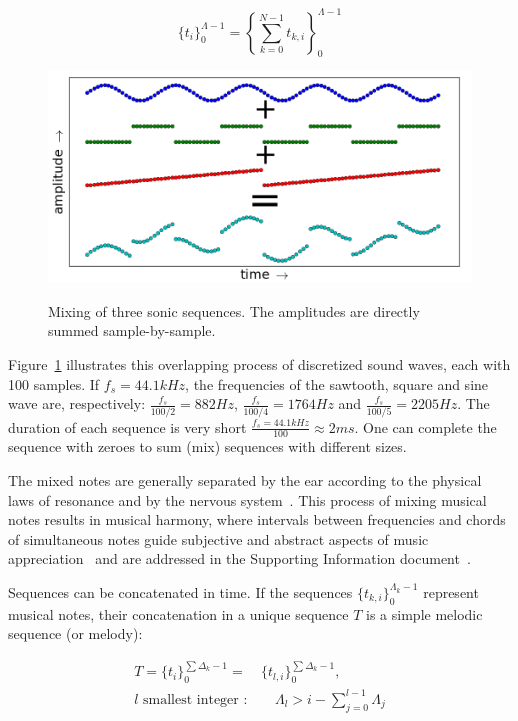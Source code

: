 \begin{equation}\label{eq:mixagem}
\{t_i\}_0^{\Lambda-1}=\left \{ \sum_{k=0}^{N-1}t_{k,i} \right \}_0^{\Lambda-1}
\end{equation}

\begin{figure}[h!]
    {\centering
        \includegraphics[width=.5\columnwidth]{figures/mixagem__}}
    \caption{Mixing of three sonic sequences. The amplitudes are directly summed sample-by-sample.}
        \label{fig:mixagem}
\end{figure}

Figure~\ref{fig:mixagem} illustrates this overlapping process of discretized sound waves, each with 100 samples. If $f_s=44.1kHz$, the frequencies of the sawtooth, square and sine wave are, respectively: $\frac{f_s}{100/2}=882Hz$, $\frac{f_s}{100/4}=1764Hz$ and $\frac{f_s}{100/5}=2205Hz$. The duration of each sequence is very short $\frac{f_s=44.1kHz}{100} \approx 2ms$. One can complete the sequence with zeroes to sum (mix) sequences with different sizes.

The mixed notes are generally separated by the ear according to the physical laws of resonance and by the nervous system~\cite{Roederer}.
This process of mixing musical notes results in musical harmony, where intervals between frequencies and chords of simultaneous notes guide subjective and abstract aspects of music appreciation~\cite{Harmonia} and are addressed in the Supporting Information document~\cite{massNotesInMusic}. 

Sequences can be concatenated in time. If the sequences $\{t_{k,i}\}_0^{\Lambda_k-1}$ represent musical notes,
their concatenation in a unique sequence $T$ is a simple melodic sequence (or melody):

\begin{equation}\label{eq:concatenacao}
\begin{split}
T = \{t_i\}_0^{\sum\Delta_k-1}= & \{t_{l,i}\}_0^{\sum\Delta_k-1}, \;\; \\ l\text{ smallest integer } : & \quad \Lambda_l > i -\sum_{j=0}^{l-1}\Lambda_j
\end{split}
\end{equation}

